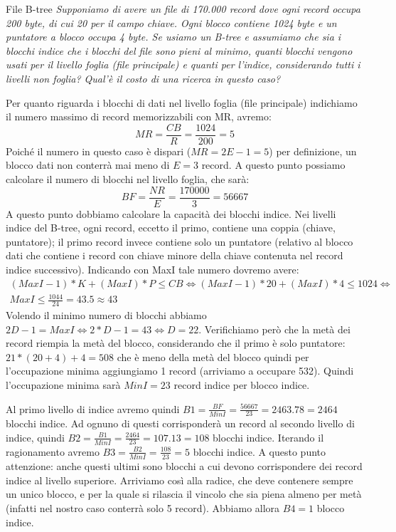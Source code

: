 \begin{Example}{File B-tree}{}
    \textit{Supponiamo di avere un file di 170.000 record dove ogni record occupa 200 byte, di cui 20 per il campo chiave. Ogni blocco contiene 1024 byte e un puntatore a blocco occupa 4 byte. Se usiamo un B-tree e assumiamo che sia i blocchi indice che i blocchi del file sono pieni al minimo, quanti blocchi vengono usati per il livello foglia (file principale) e quanti per l’indice, considerando tutti i livelli non foglia? Qual'è il costo di una ricerca in questo caso?}

    Per quanto riguarda i blocchi di dati nel livello foglia (file principale) indichiamo il numero massimo di record memorizzabili con MR, avremo:
    \begin{equation*}
        MR=\frac{CB}{R}=\frac{1024}{200}=5
    \end{equation*}
    Poiché il numero in questo caso è dispari ($MR = 2E-1 = 5$) per definizione, un blocco dati non conterrà mai meno di $E = 3$ record. A questo punto possiamo calcolare il numero di blocchi nel livello foglia, che sarà:
    \begin{equation*}
        BF=\frac{NR}{E}=\frac{170000}{3}=56667
    \end{equation*}
    A questo punto dobbiamo calcolare la capacità dei blocchi indice. Nei livelli indice del B-tree, ogni record, eccetto il primo, contiene una coppia (chiave, puntatore); il primo record invece contiene solo un puntatore (relativo al blocco dati che contiene i record con chiave minore della chiave contenuta nel record indice successivo). Indicando con MaxI tale numero dovremo avere:
    \begin{align*}
        (MaxI-1)*K+(MaxI)*P\leq CB\iff (MaxI-1)*20+(MaxI)*4\leq1024\iff\\MaxI\leq\frac{1044}{24}=43.5\approx43
    \end{align*}
    Volendo il minimo numero di blocchi abbiamo $2D-1=MaxI\iff 2*D-1=43\iff D=22$. Verifichiamo però che la metà dei record riempia la metà del blocco, considerando che il primo è solo puntatore: $21*(20+4)+4=508$ che è meno della metà del blocco  quindi per l’occupazione minima aggiungiamo 1 record (arriviamo a occupare 532). Quindi l'occupazione minima sarà $MinI=23$ record indice per blocco indice.

    Al primo livello di indice avremo quindi $B1=\frac{BF}{MinI}=\frac{56667}{23}=2463.78=2464$ blocchi indice. Ad ognuno di questi corrisponderà un record al secondo livello di indice, quindi $B2=\frac{B1}{MinI}=\frac{2464}{23}=107.13=108$ blocchi indice. Iterando il ragionamento avremo $B3=\frac{B2}{MinI}=\frac{108}{23}=5$ blocchi indice. A questo punto attenzione: anche questi ultimi sono blocchi a cui devono corrispondere dei record indice al livello superiore. Arriviamo così alla radice, che deve contenere sempre un unico blocco, e per la quale si rilascia il vincolo che sia piena almeno per metà (infatti nel nostro caso conterrà solo 5 record). Abbiamo allora $B4 = 1$ blocco indice.


\end{Example}
